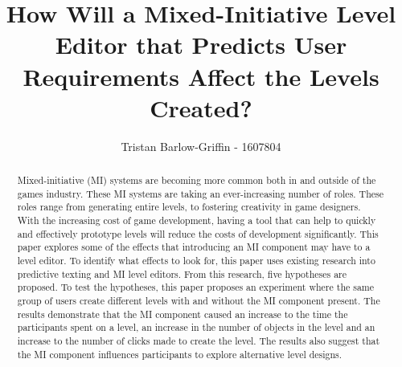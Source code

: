 \documentclass[journal]{IEEEtran}
\begin{document}
%
\title{ How Will a Mixed-Initiative Level Editor that Predicts User Requirements Affect the Levels Created?}
%
%

\author{Tristan Barlow-Griffin - 1607804}


\maketitle

\begin{abstract}
Mixed-initiative (MI) systems are becoming more common both in and outside of the games industry. These MI systems are taking an ever-increasing number of roles. These roles range from generating entire levels, to fostering creativity in game designers. With the increasing cost of game development, having a tool that can help to quickly and effectively prototype levels will reduce the costs of development significantly.
This paper explores some of the effects that introducing an MI component may have to a level editor. To identify what effects to look for, this paper uses existing research into predictive texting and MI level editors. From this research, five hypotheses are proposed. To test the hypotheses, this paper proposes an experiment where the same group of users create different levels with and without the MI component present. The results demonstrate that the MI component caused an increase to the time the participants spent on a level, an increase in the number of objects in the level and an increase to the number of clicks made to create the level. The results also suggest that the MI component influences participants to explore alternative level designs.
\end{abstract}
\end{document}
